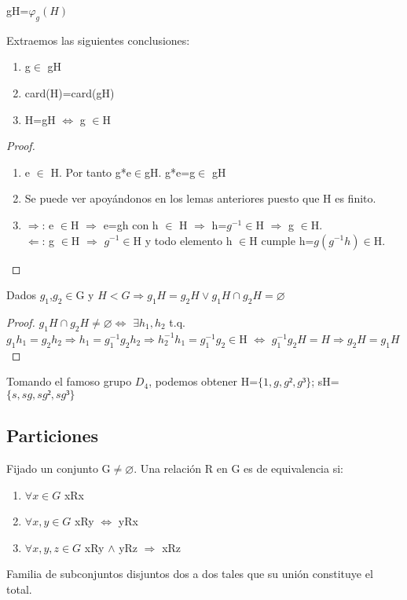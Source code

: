 \documentclass[a4paper,10pt]{apuntes}
\newenvironment{notacion}[1][Notación:]{\begin{trivlist}
\item[\hskip \labelsep {\bfseries #1}]}{\end{trivlist}}
\begin{document}
  \begin{notacion}
   gH=$\varphi_{g}(H)$
  \end{notacion}

  \begin{corol} 
  Extraemos las siguientes conclusiones:
   \begin{enumerate}
    \item g$\in$  gH
    \item card(H)=card(gH)
    \item H=gH $\Leftrightarrow$  g $\in$H
   \end{enumerate}
  \end{corol}

  \begin{proof}
   \begin{enumerate}
    \item e $\in$  H. Por tanto g*e$\in$gH. g*e=g$\in$ gH
    \item Se puede ver apoyándonos en los lemas anteriores puesto que H es finito.
    \item $\Rightarrow$:  e $\in$H $\Rightarrow$ e=gh con h $\in$ H $\Rightarrow$ h=$g^{-1}\in$H $\Rightarrow$ g $\in$H.\\
	  $\Leftarrow$:  g $\in$H $\Rightarrow$ $g^{-1}\in$H y todo elemento h $\in$H cumple h=$g(g^{-1}h)\in$H.
   \end{enumerate}
  \end{proof}
  
  \begin{prop}
   Dados $g_{1}$,$g_{2}\in$G y $H<G\Rightarrow g_{1}H=g_{2}H \vee g_{1}H\cap g_{2}H=\varnothing$
  \end{prop}
  \begin{proof}
   $g_{1}H\cap g_{2}H \neq \varnothing \Leftrightarrow$ $\exists h_{1},h_{2}$  t.q. $g_{1}h_{1}=g_{2}h_{2} \Rightarrow h_{1}=g_{1}^{-1}g_{2}h_{2} \Rightarrow h_{2}^{-1}h_{1}=g_{1}^{-1}g_{2}\in$H
   $\Leftrightarrow$ $g_{1}^{-1}g_{2}H=H \Rightarrow g_{2}H=g_{1}H$
  \end{proof}
  \begin{example}
   Tomando el famoso grupo $D_{4}$, podemos obtener H=$\{1,g,g²,g³\}$; sH=$\{s,sg,sg²,sg³\}$
  \end{example}
  \subsection{Particiones}
  \begin{defn}
   Fijado un conjunto G$\neq\varnothing$. Una relación R en G es de equivalencia si:
   \begin{enumerate}
    \item $\forall x\in G$  xRx
    \item $\forall x,y \in G$  xRy $\Leftrightarrow$  yRx
    \item $\forall x,y,z \in G$  xRy $\wedge$  yRz $\Rightarrow$  xRz
   \end{enumerate}
  \end{defn}
  \begin{defn}[Partición]
   Familia de subconjuntos disjuntos dos a dos tales que su unión constituye el total.
  \end{defn}
  
\end{document}
